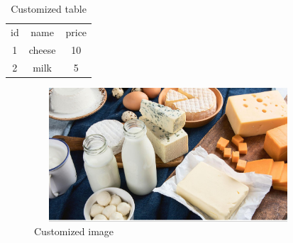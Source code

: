 \documentclass{article}
\begin{document}
\begin{table}[h!]
\centering
\begin{tabular}{ c|c|c }
id & name & price \\
1 & cheese & 10 \\
2 & milk & 5 \\
\end{tabular}
\caption{Customized table}
\end{table}
\begin{figure}[h]
\centering
\includegraphics[width=10cm, height=5cm]{./cheese_and_milk.png}
\caption{Customized image}
\end{figure}
\end{document}
